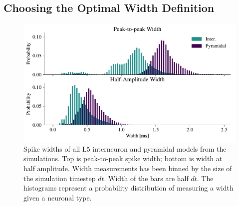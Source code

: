 \documentclass[altfont, fleqn]{uiophd}
\begin{document}
\subsection{Choosing the Optimal Width Definition}
\label{sec:optimal_width_def}

\begin{figure}[h]
    \begin{center}
        \includegraphics[width=\textwidth]{images/sec_4/int_pyr_width_I_II.pdf}
        \caption{
            Spike widths of all L5 interneuron and pyramidal models from
            the simulations. 
            Top is peak-to-peak spike width; bottom is 
            width at half amplitude.
            Width measurements has been binned by the size of the simulation timestep 
            $dt$.
            Width of the bars are half $dt$.
            The histograms represent a probability distribution of measuring a width
            given a neuronal type. 
        }
        \label{fig:4_width_I_II_histograms}
    \end{center}
\end{figure}
\end{document}
